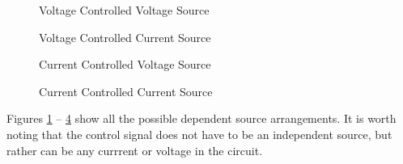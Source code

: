 \documentclass{handout}
\begin{document}
\newpage
\clearpage
\pagebreak

\begin{figure} [h! t! b!]
\centering
{}
\caption{Voltage Controlled Voltage Source}
\label{fig: VCVS}
\end{figure}

\begin{figure} [h! t! b!]
\centering
{}
\caption{Voltage Controlled Current Source}
\label{fig: VCCS}
\end{figure}

\begin{figure} [h! t! b!]
\centering
{}
\caption{Current Controlled Voltage Source}
\label{fig: CCVS}
\end{figure}

\begin{figure} [h! t! b!]
\centering
{}
\caption{Current Controlled Current Source}
\label{fig: CCCS}
\end{figure}

Figures \ref{fig: VCVS} -- \ref{fig: CCCS} show all the possible dependent source arrangements. It is worth noting that the control signal does not have to be an independent source, but rather can be any currrent or voltage in the circuit.
\end{document}
